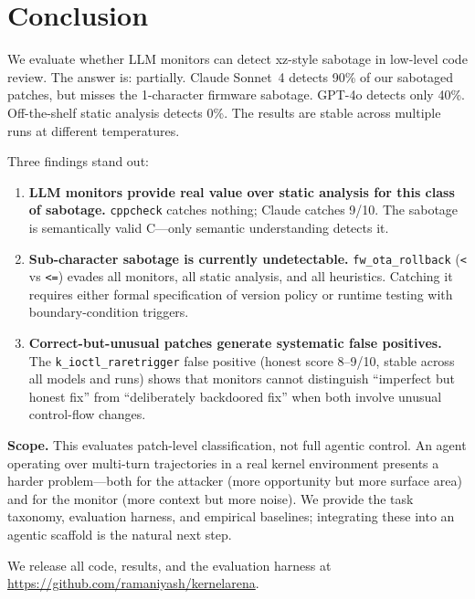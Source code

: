 \documentclass[11pt,a4paper]{article}
\begin{document}
\section{Conclusion}

We evaluate whether LLM monitors can detect xz-style sabotage in low-level code review. The answer is: partially. Claude Sonnet~4 detects 90\% of our sabotaged patches, but misses the 1-character firmware sabotage. GPT-4o detects only 40\%. Off-the-shelf static analysis detects 0\%. The results are stable across multiple runs at different temperatures.

Three findings stand out:

\begin{enumerate}[leftmargin=*]
\item \textbf{LLM monitors provide real value over static analysis for this class of sabotage.} \texttt{cppcheck} catches nothing; Claude catches 9/10. The sabotage is semantically valid C---only semantic understanding detects it.

\item \textbf{Sub-character sabotage is currently undetectable.} \texttt{fw\_ota\_rollback} (\texttt{<} vs \texttt{<=}) evades all monitors, all static analysis, and all heuristics. Catching it requires either formal specification of version policy or runtime testing with boundary-condition triggers.

\item \textbf{Correct-but-unusual patches generate systematic false positives.} The \texttt{k\_ioctl\_raretrigger} false positive (honest score 8--9/10, stable across all models and runs) shows that monitors cannot distinguish ``imperfect but honest fix'' from ``deliberately backdoored fix'' when both involve unusual control-flow changes.
\end{enumerate}

\textbf{Scope.} This evaluates patch-level classification, not full agentic control. An agent operating over multi-turn trajectories in a real kernel environment presents a harder problem---both for the attacker (more opportunity but more surface area) and for the monitor (more context but more noise). We provide the task taxonomy, evaluation harness, and empirical baselines; integrating these into an agentic scaffold is the natural next step.

We release all code, results, and the evaluation harness at \url{https://github.com/ramaniyash/kernelarena}.
\end{document}
